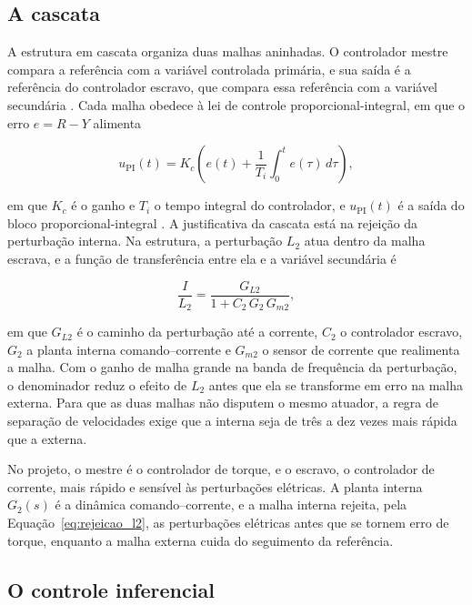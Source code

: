 \subsection{A cascata}
\label{sec:cascata}

A estrutura em cascata organiza duas malhas aninhadas. O controlador mestre compara a
referência com a variável controlada primária, e sua saída é a referência do
controlador escravo, que compara essa referência com a variável secundária
\cite{raffo_tcpi_cascata}. Cada malha obedece à lei de controle proporcional-integral,
em que o erro $e = R - Y$ alimenta

\begin{equation}\label{eq:pi}
u_{\mathrm{PI}}(t) = K_c\left(e(t) + \frac{1}{T_i}\int_0^t e(\tau)\,d\tau\right),
\end{equation}

em que $K_c$ é o ganho e $T_i$ o tempo integral do controlador, e
$u_{\mathrm{PI}}(t)$ é a saída do bloco proporcional-integral
\cite{raffo_tcpi_pid2}. A justificativa da cascata está na rejeição da perturbação
interna. Na estrutura, a perturbação $L_2$ atua dentro da malha
escrava, e a função de transferência entre ela e a variável secundária é

\begin{equation}\label{eq:rejeicao_l2}
\frac{I}{L_2} = \frac{G_{L2}}{1 + C_2\,G_2\,G_{m2}},
\end{equation}

em que $G_{L2}$ é o caminho da perturbação até a corrente, $C_2$ o controlador
escravo, $G_2$ a planta interna comando--corrente e $G_{m2}$ o sensor de corrente que
realimenta a malha. Com o
ganho de malha grande na banda de frequência da perturbação, o denominador reduz o
efeito de $L_2$ antes que ela se transforme em erro na malha externa. Para que as duas
malhas não disputem o mesmo atuador, a regra de separação de velocidades exige que a
interna seja de três a dez vezes mais rápida que a externa.

No projeto, o mestre é o
controlador de torque, e o escravo, o controlador de corrente, mais rápido e sensível às
perturbações elétricas. A planta interna $G_2(s)$ é a dinâmica comando--corrente, e a
malha interna rejeita, pela Equação~\eqref{eq:rejeicao_l2}, as perturbações elétricas
antes que se tornem erro de torque, enquanto a malha externa cuida do seguimento da
referência.

\subsection{O controle inferencial}
\label{sec:inferencial}

